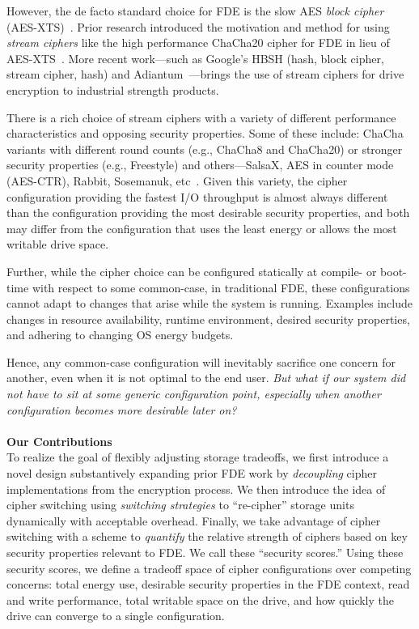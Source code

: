 However, the de facto standard choice for FDE is the slow AES \emph{block
cipher} (AES-XTS)~\cite{XTS, XTSComments, NISTXTS}. Prior research introduced
the motivation and method for using \emph{stream ciphers} like the high
performance ChaCha20 cipher for FDE in lieu of AES-XTS~\cite{StrongBox,
ChaCha20}. More recent work---such as Google's HBSH (hash, block cipher, stream
cipher, hash) and Adiantum~\cite{Adiantum}---brings the use of stream ciphers
for drive encryption to industrial strength products.

There is a rich choice of stream ciphers with a variety of different performance
characteristics and opposing security properties. Some of these include: ChaCha
variants with different round counts (e.g., ChaCha8 and ChaCha20) or stronger
security properties (e.g., Freestyle) and others---SalsaX, AES in counter mode
(AES-CTR), Rabbit, Sosemanuk, etc~\cite{Freestyle, SalsaX, Rabbit, Sosemanuk,
ChaCha20, AESCTR}. Given this variety, the cipher configuration providing the
fastest I/O throughput is almost always different than the configuration
providing the most desirable security properties, and both may differ from the
configuration that uses the least energy or allows the most writable
drive space.

Further, while the cipher choice can be configured statically at compile- or
boot-time with respect to some common-case, in traditional FDE, these
configurations cannot adapt to changes that arise while the system is running.
Examples include changes in resource availability, runtime environment, desired
security properties, and adhering to changing OS energy budgets.

Hence, any common-case configuration will inevitably sacrifice one concern for
another, even when it is not optimal to the end user. \emph{But what if our
system did not have to sit at some generic configuration point, especially when
another configuration becomes more desirable later on?}\\
\\
\textbf{Our Contributions}\\
To realize the goal of flexibly adjusting storage tradeoffs, we first introduce
a novel design substantively expanding prior FDE work by \emph{decoupling}
cipher implementations from the encryption process. We then introduce the idea
of cipher switching using \emph{switching strategies} to ``re-cipher'' storage
units dynamically with acceptable overhead. Finally, we take advantage of cipher
switching with a scheme to \emph{quantify} the relative strength of ciphers
based on key security properties relevant to FDE. We call these ``security
scores.'' Using these security scores, we define a tradeoff space of cipher
configurations over competing concerns: total energy use, desirable security
properties in the FDE context, read and write performance, total writable space
on the drive, and how quickly the drive can converge to a single configuration.

